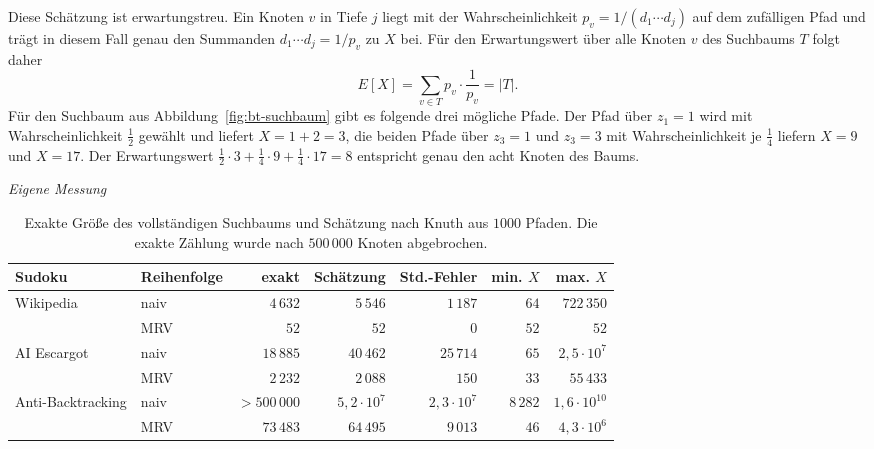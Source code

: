 Diese Schätzung ist erwartungstreu. 
Ein Knoten $v$ in Tiefe $j$ liegt mit der Wahrscheinlichkeit $p_v = 1/(d_1 \cdots d_j)$ auf dem zufälligen Pfad 
und trägt in diesem Fall genau den Summanden $d_1 \cdots d_j = 1/p_v$ zu $X$ bei. 
Für den Erwartungswert über alle Knoten $v$ des Suchbaums $T$ folgt daher
\begin{equation}
	E[X] = \sum_{v \in T} p_v \cdot \frac{1}{p_v} = |T|.
\end{equation}
Für den Suchbaum aus Abbildung~\ref{fig:bt-suchbaum} gibt es folgende drei mögliche Pfade. 
Der Pfad über $z_1 = 1$ wird mit Wahrscheinlichkeit $\frac{1}{2}$ gewählt und liefert $X = 1 + 2 = 3$, 
die beiden Pfade über $z_3 = 1$ und $z_3 = 3$ mit Wahrscheinlichkeit je $\frac{1}{4}$ 
liefern $X = 9$ und $X = 17$. 
Der Erwartungswert $\frac{1}{2} \cdot 3 + \frac{1}{4} \cdot 9 + \frac{1}{4} \cdot 17 = 8$ 
entspricht genau den acht Knoten des Baums.

\begin{table}[hbt]
	\centering
	\caption[Exakte Suchbaumgröße und Schätzung nach Knuth]{Exakte Größe des vollständigen Suchbaums und Schätzung nach Knuth aus $1000$ Pfaden.
	Die exakte Zählung wurde nach $500\,000$ Knoten abgebrochen.} {\emph{Eigene Messung}}
	\label{tab:bt-knuth}
	\small
	\setlength{\tabcolsep}{4pt}
	\begin{tabular}{llrrrrr}
		\toprule
		Sudoku & Reihenfolge & exakt & Schätzung & Std.-Fehler & min. $X$ & max. $X$ \\
		\midrule
		Wikipedia         & naiv     & $4\,632$     & $5\,546$      & $1\,187$      & $64$      & $722\,350$ \\
		                  & \acs{MRV} & $52$        & $52$          & $0$           & $52$      & $52$ \\
		AI Escargot       & naiv     & $18\,885$    & $40\,462$     & $25\,714$     & $65$      & $2{,}5 \cdot 10^{7}$ \\
		                  & \acs{MRV} & $2\,232$    & $2\,088$      & $150$         & $33$      & $55\,433$ \\
		Anti-Backtracking & naiv     & $>500\,000$  & $5{,}2 \cdot 10^{7}$ & $2{,}3 \cdot 10^{7}$ & $8\,282$ & $1{,}6 \cdot 10^{10}$ \\
		                  & \acs{MRV} & $73\,483$   & $64\,495$     & $9\,013$      & $46$      & $4{,}3 \cdot 10^{6}$ \\
		\bottomrule
	\end{tabular}
\end{table}

